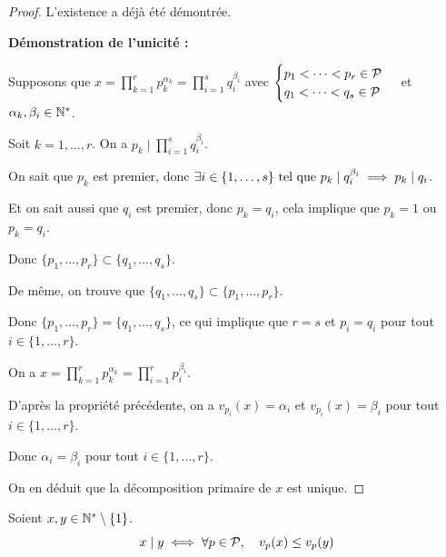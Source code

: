 \documentclass[12pt, a4paper]{report}
\begin{document}
\begin{proof}
    L'existence a déjà été démontrée.

    \textbf{Démonstration de l'unicité :}

    Supposons que $x=\prod_{k=1}^r p_k^{\alpha_k} = \prod_{i=1}^s q_i^{\beta_i}$ avec $\begin{cases}p_1<\dots<p_r \in \mathcal{P}\\q_1<\dots<q_s \in \mathcal{P}\end{cases}$ et $\alpha_k,\beta_i \in \mathbb{N}^*$.

    Soit $k=1,\dots,r$. On a $p_k \mid \prod_{i=1}^s q_i^{\beta_i}$.

    On sait que $p_k$ est premier, donc $\exists i \in \{1,\dots,s\} \text{ tel que } p_k \mid q_i^{\beta_i} \implies p_k \mid q_i$.

    Et on sait aussi que $q_i$ est premier, donc $p_k = q_i$, cela implique que $p_k = 1$ ou $p_k = q_i$.

    Donc $\{p_1,\dots,p_r\}\subset \{q_1,\dots,q_s\}$.

    De même, on trouve que $\{q_1,\dots,q_s\} \subset \{p_1,\dots,p_r\}$.

    Donc $\{p_1,\dots,p_r\} = \{q_1,\dots,q_s\}$, ce qui implique que $r=s$ et $p_i = q_i$ pour tout $i \in \{1,\dots,r\}$.

    On a $x = \prod_{k=1}^r p_k^{\alpha_k} = \prod_{i=1}^r p_i^{\beta_i}$.

    D'après la propriété précédente, on a $v_{p_i}(x) = \alpha_i$ et $v_{p_i}(x) = \beta_i$ pour tout $i \in \{1,\dots,r\}$.

    Donc $\alpha_i = \beta_i$ pour tout $i \in \{1,\dots,r\}$.

    On en déduit que la décomposition primaire de $x$ est unique.
\end{proof}

\begin{property}
    Soient $x,y \in \mathbb{N}^*\setminus\{1\}$.
    $$x\mid y \iff \forall p \in \mathcal{P}, \quad v_p(x) \le v_p(y)$$
\end{property}
\label{prop:div_et_valuation}
\end{document}
